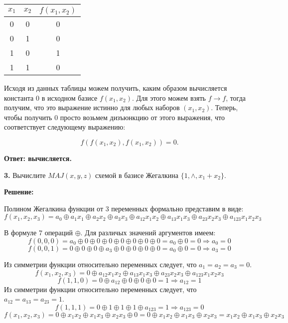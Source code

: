 \documentclass[a4paper,12pt]{article} %
\begin{document}
\begin{center}
\begin{tabular}{|c|c|c|}
\hline 
$x_1$ & $x_2$ & $f(x_1,x_2)$ \\ 
\hline 
0 & 0 & 0 \\ 
\hline 
0 & 1 & 0 \\ 
\hline 
1 & 0 & 1 \\ 
\hline 
1 & 1 & 0 \\ 
\hline 
\end{tabular} 
\end{center}

Исходя из данных таблицы можем получить, каким образом вычисляется константа $0$ в исходном базисе $f(x_1,x_2)$. Для этого можем взять $f \rightarrow f$, тогда получим, что это выражение истинно для любых наборов $(x_1,x_2)$. Теперь, чтобы получить $0$ просто возьмем дизъюнкцию от этого выражения, что соответствует следующему выражению:

\[ f(f(x_1,x_2),f(x_1,x_2)) = 0  .\]

\begin{flushright}
\begin{large}
\textbf {Ответ: вычисляется.}
\end{large}
\end{flushright}

{\bf 3.} Вычислите $MAJ(x, y, z)$ схемой в базисе Жегалкина $\{1, \wedge, x_1 + x_2\}$.
\begin{center}
\bfseries
{\Large Решение: }
\end{center}
Полином Жегалкина функции от 3 переменных формально представим в виде:
\[f(x_1,x_2,x_3) = a_0 \oplus a_1x_1 \oplus a_2x_2 \oplus a_3x_3 \oplus a_{12}x_1x_2 \oplus a_{13}x_1x_3 \oplus a_{23}x_2x_3 \oplus a_{123}x_1x_2x_3\]

В формуле $7$ операций $\oplus$. Для различых значений аргументов имеем:
\[f(0,0,0) = a_0 \oplus 0 \oplus 0 \oplus 0 \oplus 0 \oplus 0 \oplus 0 \oplus 0 = a_0 \oplus 0 = 0 \Rightarrow a_0 = 0\]
\[f(0,0,1) = 0 \oplus 0 \oplus 0 \oplus a_3 \oplus 0 \oplus 0 \oplus 0 \oplus 0 = a_0 \oplus 0 = 0 \Rightarrow a_3 = 0\]

Из симметрии функции относительно переменных следует, что $a_1 = a_2 = a_3 = 0$.
\[f(x_1,x_2,x_3) = 0 \oplus a_{12}x_1x_2 \oplus a_{13}x_1x_3 \oplus a_{23}x_2x_3 \oplus a_{123}x_1x_2x_3\]
\[f(1,1,0) = 0 \oplus a_{12} \oplus 0 \oplus 0 \oplus 0 = 1 \Rightarrow a_{12} = 1\]
Из симметрии функции относительно переменных следует, что $a_{12} = a_{13} = a_{23} = 1$.
\[f(1,1,1) = 0 \oplus 1 \oplus 1 \oplus 1 \oplus a_{123} = 1 \Rightarrow a_{123} = 0\]
\[f(x_1,x_2,x_3) = 0 \oplus x_1x_2 \oplus x_1x_3 \oplus x_2x_3 \oplus 0 = 0 \oplus x_1x_2 \oplus x_1x_3 \oplus x_2x_3 = x_1x_2 \oplus x_1x_3 \oplus x_2x_3\]
\end{document}
